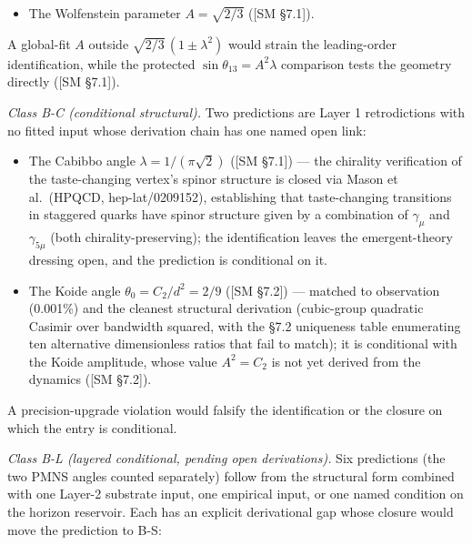 \documentclass[
]{article}
\providecommand{\tightlist}{%
  \setlength{\itemsep}{0pt}\setlength{\parskip}{0pt}}
\begin{document}
\begin{itemize}
\tightlist
\item
  The Wolfenstein parameter \(A = \sqrt{2/3}\) ({[}SM §7.1{]}).
\end{itemize}

A global-fit \(A\) outside \(\sqrt{2/3}\,(1 \pm \lambda^2)\) would
strain the leading-order identification, while the protected
\(\sin\theta_{13} = A^2\lambda\) comparison tests the geometry directly
({[}SM §7.1{]}).

\emph{Class B-C (conditional structural).} Two predictions are Layer 1
retrodictions with no fitted input whose derivation chain has one named
open link:

\begin{itemize}
\tightlist
\item
  The Cabibbo angle \(\lambda = 1/(\pi\sqrt{2})\) ({[}SM §7.1{]}) ---
  the chirality verification of the taste-changing vertex's spinor
  structure is closed via Mason et al.~(HPQCD, hep-lat/0209152),
  establishing that taste-changing transitions in staggered quarks have
  spinor structure given by a combination of \(\gamma_\mu\) and
  \(\gamma_{5\mu}\) (both chirality-preserving); the identification
  leaves the emergent-theory dressing open, and the prediction is
  conditional on it.
\item
  The Koide angle \(\theta_0 = C_2/d^2 = 2/9\) ({[}SM §7.2{]}) ---
  matched to observation (0.001\%) and the cleanest structural
  derivation (cubic-group quadratic Casimir over bandwidth squared, with
  the §7.2 uniqueness table enumerating ten alternative dimensionless
  ratios that fail to match); it is conditional with the Koide
  amplitude, whose value \(A^2 = C_2\) is not yet derived from the
  dynamics ({[}SM §7.2{]}).
\end{itemize}

A precision-upgrade violation would falsify the identification or the
closure on which the entry is conditional.

\emph{Class B-L (layered conditional, pending open derivations).} Six
predictions (the two PMNS angles counted separately) follow from the
structural form combined with one Layer-2 substrate input, one empirical
input, or one named condition on the horizon reservoir. Each has an
explicit derivational gap whose closure would move the prediction to
B-S:
\end{document}
